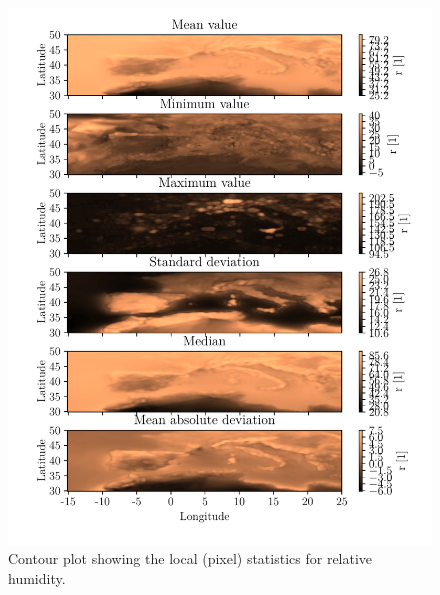 \begin{figure}[ht]
    \centering
    \includegraphics{python_figs/all_stat_variable_r.pdf}
    \caption{Contour plot showing the local (pixel) statistics for relative humidity.}
    \label{fig:all_stats_r}
\end{figure}


